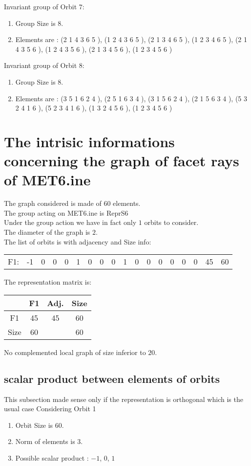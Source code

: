 \documentclass[12pt]{article}
\begin{document}
Invariant group of Orbit $7$:
\begin{enumerate}
\item Group Size is $8$.
\item Elements are : (2 1 4 3 6 5  ), (1 2 4 3 6 5  ), (2 1 3 4 6 5  ), (1 2 3 4 6 5  ), (2 1 4 3 5 6  ), (1 2 4 3 5 6  ), (2 1 3 4 5 6  ), (1 2 3 4 5 6  )
\end{enumerate}
Invariant group of Orbit $8$:
\begin{enumerate}
\item Group Size is $8$.
\item Elements are : (3 5 1 6 2 4  ), (2 5 1 6 3 4  ), (3 1 5 6 2 4  ), (2 1 5 6 3 4  ), (5 3 2 4 1 6  ), (5 2 3 4 1 6  ), (1 3 2 4 5 6  ), (1 2 3 4 5 6  )
\end{enumerate}
\section{The intrisic informations concerning the graph of facet rays of MET6.ine}
The graph considered is made of $60$ elements.\\
The group acting on MET6.ine is ReprS6\\
Under the group action we have in fact only $1$ orbits to consider.\\
The diameter of the graph is $2$.\\
The list of orbits is with adjacency and Size info:
\begin{center}
\scriptsize
\begin{tabular}{cccccccccccccccc|c|c}
F1:&-1&0&0&0&1&0&0&0&1&0&0&0&0&0&0&45&60\\
\end{tabular}
\end{center}
The representation matrix is:
\begin{center}
\scriptsize
\begin{tabular}{|c|c|c|c|}
\hline
&F1&Adj.&Size\\
\hline
F1& 45&45&60\\
\hline
Size&60&&60\\
\hline
\end{tabular}
\end{center}
No complemented local graph of size inferior to $20$.
\subsection{scalar product between elements of orbits}
\noindent This subsection made sense only if the representation is orthogonal which is the usual case
Considering Orbit 1
\begin{enumerate}
\item Orbit Size is $60$.
\item Norm of elements is $3$.
\item Possible scalar product : $-1$, $0$, $1$
\end{enumerate}
\end{document}
